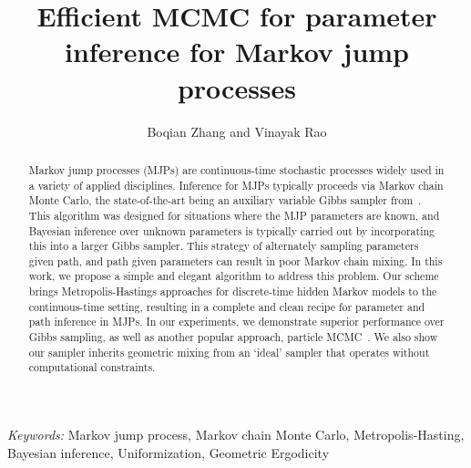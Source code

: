 \documentclass{statsoc}
\title[Efficient MCMC for parameter inference for MJPs]{\bf Efficient MCMC for parameter inference for Markov jump processes}
\author{Boqian Zhang and Vinayak Rao}
\begin{document}
\def\spacingset#1{\renewcommand{\baselinestretch}
{#1}\small\normalsize} \spacingset{1}



\begin{abstract}
Markov jump processes (MJPs) are continuous-time stochastic processes 
widely used in a variety of applied disciplines. Inference for MJPs typically
proceeds via Markov chain Monte Carlo, the state-of-the-art being an auxiliary
variable Gibbs sampler from~\cite{RaoTeh13}. This algorithm was
designed for situations where the MJP parameters are known, and Bayesian
inference over unknown parameters is typically carried out by incorporating
this into a larger Gibbs sampler.
This strategy of alternately sampling parameters given path, and
path given parameters can result in poor Markov chain mixing. In this
work, we propose a simple and elegant algorithm to address this
problem. Our scheme brings Metropolis-Hastings approaches
for discrete-time hidden Markov models to the continuous-time
setting, %
resulting in %
 a complete and clean recipe for
parameter and path inference in MJPs. In our experiments, we
demonstrate superior performance over Gibbs sampling, as well as
another popular approach, particle MCMC~\cite{Andrieu10}.
We also show our sampler inherits geometric mixing from an `ideal' 
sampler that operates without computational constraints.
\end{abstract}
\noindent%
{\it Keywords:}  Markov jump process, Markov chain Monte Carlo, Metropolis-Hasting, Bayesian
inference, Uniformization, Geometric Ergodicity
\vspace{-.05in}






%








%
\end{document}
